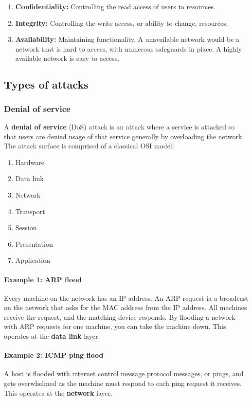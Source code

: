 \begin{enumerate}
    \item \textbf{Confidentiality:} Controlling the read access of users to resources.
    \item \textbf{Integrity:} Controlling the write access, or ability to change, resources.
    \item \textbf{Availability:} Maintaining functionality. A unavailable network would be a network that is hard to access, with numerous safeguards in place. A highly available network is easy to access.
\end{enumerate}

\subsection{Types of attacks}

\subsubsection{Denial of service}

A \textbf{denial of service} (DoS) attack is an attack where a service is attacked so that users are denied usage of that service generally by overloading the network. The attack surface is comprised of a classical OSI model:

\begin{enumerate}
    \item Hardware
    \item Data link
    \item Network
    \item Transport
    \item Session
    \item Presentation
    \item Application
\end{enumerate}

\paragraph{Example 1: ARP flood} Every machine on the network has an IP address. An ARP request ia a broadcast on the network that asks for the MAC address from the IP address. All machines receive the request, and the matching device responds. By flooding a network with ARP requests for one machine, you can take the machine down. This operates at the \textbf{data link} layer.

\paragraph{Example 2: ICMP ping flood} A host is flooded with internet control message protocol messages, or pings, and gets overwhelmed as the machine must respond to each ping request it receives. This operates at the \textbf{network} layer.

